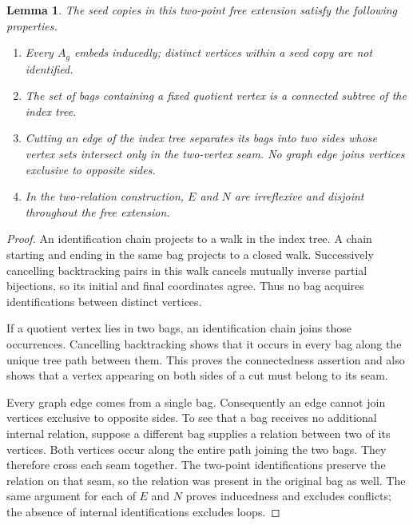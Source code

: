 \documentclass[10pt,a4paper]{amsart}
\newtheorem{lemma}[theorem]{Lemma}
\begin{document}
\begin{lemma}\label{lem:tree-structure}
The seed copies in this two-point free extension satisfy the following properties.
\begin{enumerate}
\item Every $A_g$ embeds inducedly; distinct vertices within a seed copy are not identified.
\item The set of bags containing a fixed quotient vertex is a connected subtree of the index tree.
\item Cutting an edge of the index tree separates its bags into two sides whose vertex sets intersect only in the two-vertex seam. No graph edge joins vertices exclusive to opposite sides.
\item In the two-relation construction, $E$ and $N$ are irreflexive and disjoint throughout the free extension.
\end{enumerate}
\end{lemma}
\begin{proof}
An identification chain projects to a walk in the index tree. A chain starting and ending in the same bag projects to a closed walk. Successively cancelling backtracking pairs in this walk cancels mutually inverse partial bijections, so its initial and final coordinates agree. Thus no bag acquires identifications between distinct vertices.

If a quotient vertex lies in two bags, an identification chain joins those occurrences. Cancelling backtracking shows that it occurs in every bag along the unique tree path between them. This proves the connectedness assertion and also shows that a vertex appearing on both sides of a cut must belong to its seam.

Every graph edge comes from a single bag. Consequently an edge cannot join vertices exclusive to opposite sides. To see that a bag receives no additional internal relation, suppose a different bag supplies a relation between two of its vertices. Both vertices occur along the entire path joining the two bags. They therefore cross each seam together. The two-point identifications preserve the relation on that seam, so the relation was present in the original bag as well. The same argument for each of $E$ and $N$ proves inducedness and excludes conflicts; the absence of internal identifications excludes loops.
\end{proof}
\end{document}
